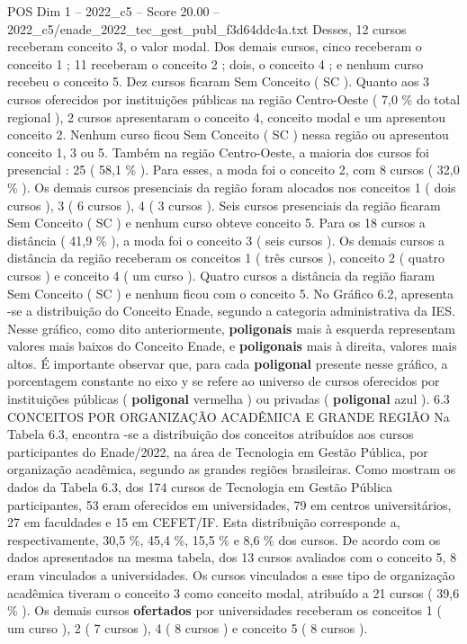 \begin{textsample}{POS Dim 1 – 2022\_c5 – Score 20.00 – 2022\_c5/enade\_2022\_tec\_gest\_publ\_f3d64ddc4a.txt}
Desses, 12 cursos receberam conceito 3, o valor modal.
Dos demais cursos, cinco receberam o conceito 1 ; 11 receberam o conceito 2 ; dois, o conceito 4 ; e nenhum curso recebeu o conceito 5.
Dez cursos ficaram Sem Conceito ( SC ).
Quanto aos 3 cursos oferecidos por instituições públicas na região Centro-Oeste ( 7,0 \% do total regional ), 2 cursos apresentaram o conceito 4, conceito modal e um apresentou conceito 2.
Nenhum curso ficou Sem Conceito ( SC ) nessa região ou apresentou conceito 1, 3 ou 5.
Também na região Centro-Oeste, a maioria dos cursos foi presencial : 25 ( 58,1 \% ).
Para esses, a moda foi o conceito 2, com 8 cursos ( 32,0 \% ).
Os demais cursos presenciais da região foram alocados nos conceitos 1 ( dois cursos ), 3 ( 6 cursos ), 4 ( 3 cursos ).
Seis cursos presenciais da região ficaram Sem Conceito ( SC ) e nenhum curso obteve conceito 5.
Para os 18 cursos a distância ( 41,9 \% ), a moda foi o conceito 3 ( seis cursos ).
Os demais cursos a distância da região receberam os conceitos 1 ( três cursos ), conceito 2 ( quatro cursos ) e conceito 4 ( um curso ).
Quatro cursos a distância da região fiaram Sem Conceito ( SC ) e nenhum ficou com o conceito 5.
No Gráfico 6.2, apresenta -se a distribuição do Conceito Enade, segundo a categoria administrativa da IES.
Nesse gráfico, como dito anteriormente, \textbf{poligonais} mais à esquerda representam valores mais baixos do Conceito Enade, e \textbf{poligonais} mais à direita, valores mais altos.
É importante observar que, para cada \textbf{poligonal} presente nesse gráfico, a porcentagem constante no eixo y se refere ao universo de cursos oferecidos por instituições públicas ( \textbf{poligonal} vermelha ) ou privadas ( \textbf{poligonal} azul ). 6.3 CONCEITOS POR ORGANIZAÇÃO ACADÊMICA E GRANDE REGIÃO Na Tabela 6.3, encontra -se a distribuição dos conceitos atribuídos aos cursos participantes do Enade/2022, na área de Tecnologia em Gestão Pública, por organização acadêmica, segundo as grandes regiões brasileiras.
Como mostram os dados da Tabela 6.3, dos 174 cursos de Tecnologia em Gestão Pública participantes, 53 eram oferecidos em universidades, 79 em centros universitários, 27 em faculdades e 15 em CEFET/IF.
Esta distribuição corresponde a, respectivamente, 30,5 \%, 45,4 \%, 15,5 \% e 8,6 \% dos cursos.
De acordo com os dados apresentados na mesma tabela, dos 13 cursos avaliados com o conceito 5, 8 eram vinculados a universidades.
Os cursos vinculados a esse tipo de organização acadêmica tiveram o conceito 3 como conceito modal, atribuído a 21 cursos ( 39,6 \% ).
Os demais cursos \textbf{ofertados} por universidades receberam os conceitos 1 ( um curso ), 2 ( 7 cursos ), 4 ( 8 cursos ) e conceito 5 ( 8 cursos ).

\end{textsample}
